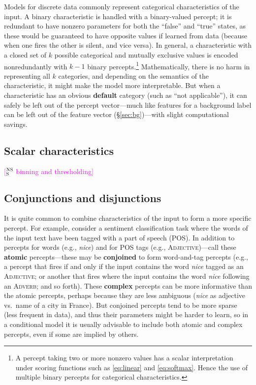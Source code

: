 \documentclass[11pt,letterpaper]{article}
\newcommand{\ensuretext}[1]{#1}
\newcommand{\nssmarker}{\ensuretext{\textcolor{magenta}{\ensuremath{^{\textsc{NS}}_{\textsc{S}}}}}}
\newcommand{\arkcomment}[3]{\ensuretext{\textcolor{#3}{[#1 #2]}}}
\newcommand{\nss}[1]{\arkcomment{\nssmarker}{#1}{magenta}}
\newcommand{\Sref}[1]{\S\ref{#1}}
\newcommand{\eref}[1]{\eqref{#1}}
\begin{document}
Models for discrete data commonly represent categorical characteristics of the input.
A binary characteristic is handled with a binary-valued percept; it is redundant to have 
nonzero parameters for both the ``false'' and ``true'' states, as these would be guaranteed 
to have opposite values if learned from data (because when one fires the other is silent, and vice versa).
In general, a characteristic with a closed set of $k$ possible categorical and mutually exclusive values 
is encoded nonredundantly with $k-1$ binary percepts.\footnote{A percept taking two or more nonzero values has a scalar 
interpretation under scoring functions such as \eref{eq:linear} and \eref{eq:softmax}. 
Hence the use of multiple binary percepts for categorical characteristics.}
Mathematically, there is no harm in representing all $k$ categories, 
and depending on the semantics of the characteristic, it might make the model more interpretable.
But when a characteristic has an obvious {\bf default} category (such as ``not applicable''),
it can safely be left out of the percept vector---much like features for a background label 
can be left out of the feature vector (\Sref{sec:bg})---with slight computational savings.

\subsection{Scalar characteristics}

\nss{binning and thresholding}



\subsection{Conjunctions and disjunctions}\label{sec:complex}

It is quite common to combine characteristics of the input to form a more specific percept.
For example, consider a sentiment classification task where the words of the input text have been 
tagged with a part of speech (POS). In addition to percepts for words (e.g., \textit{nice}) 
and for POS tags (e.g., \textsc{Adjective})---call these \textbf{atomic} percepts---these may be 
\textbf{conjoined} to form word-and-tag percepts (e.g., a percept that fires if and only if the input contains 
the word \textit{nice} tagged as an \textsc{Adjective}; or another that fires where the input contains 
the word \textit{nice} following an \textsc{Adverb}; and so forth).
These \textbf{complex} percepts can be more informative than the atomic percepts, 
perhaps because they are less ambiguous (\textit{nice} as adjective vs.~name of a city in France).
But conjoined percepts tend to be more sparse (less frequent in data), and thus their parameters might be harder to learn, 
so in a conditional model it is usually advisable to include both atomic and complex percepts, 
even if some are implied by others.
\end{document}
